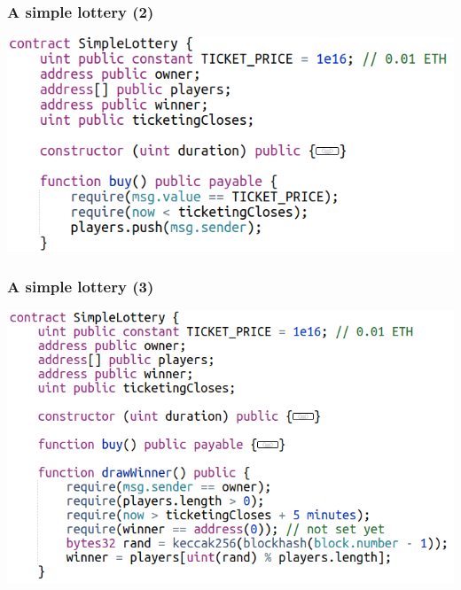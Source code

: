 \documentclass[11pt]{beamer}  %
\begin{document}
\begin{frame}\frametitle{A simple lottery (2)}

  \begin{center}
    \includegraphics[scale=0.45,clip=false]{pictures/simple-lottery-2.png}
  \end{center}

\end{frame}

\begin{frame}\frametitle{A simple lottery (3)}

  \begin{center}
    \includegraphics[scale=0.45,clip=false]{pictures/simple-lottery-3.png}
  \end{center}

\end{frame}
\end{document}
